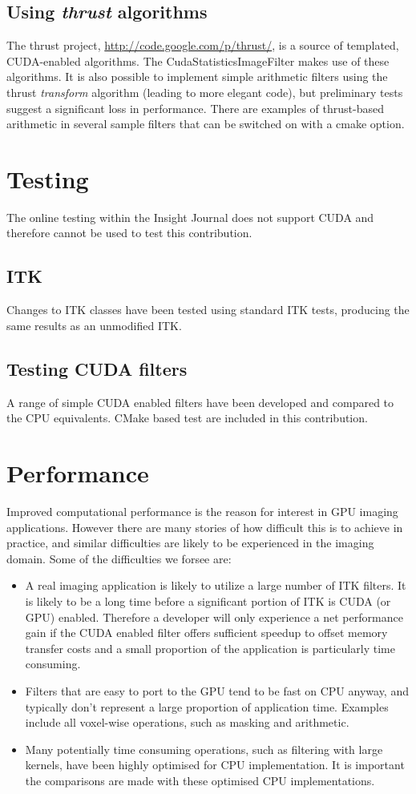 \documentclass{InsightArticle}
\begin{document}
\subsection{Using {\em thrust} algorithms}
The thrust project, \url{http://code.google.com/p/thrust/}, is a
source of templated, CUDA-enabled algorithms. The
CudaStatisticsImageFilter makes use of these algorithms. It is also
possible to implement simple arithmetic filters using the thrust {\em
  transform} algorithm (leading to more elegant code), but preliminary
tests suggest a significant loss in performance. There are
examples of thrust-based arithmetic in several sample filters that can
be switched on with a cmake option.

\section{Testing}
The online testing within the Insight Journal does not support CUDA
and therefore cannot be used to test this contribution.
\subsection{ITK}
Changes to ITK classes have been tested using standard ITK tests,
producing the same results as an unmodified ITK.
\subsection{Testing CUDA filters}
A range of simple CUDA enabled filters have been developed and
compared to the CPU equivalents. CMake based test are included in this
contribution.

\section{Performance}
Improved computational performance is the reason for interest in GPU
imaging applications. However there are many stories of how difficult
this is to achieve in practice, and similar difficulties are likely to
be experienced in the imaging domain. Some of the difficulties we
forsee are:
\begin{itemize}
\item A real imaging application is likely to utilize a large number
  of ITK filters. It is likely to be a long time before a significant
  portion of ITK is CUDA (or GPU) enabled. Therefore a developer will
  only experience a net performance gain if the CUDA enabled filter
  offers sufficient speedup to offset memory transfer costs and a
  small proportion of the application is particularly time consuming.
\item Filters that are easy to port to the GPU tend to be fast on CPU
  anyway, and typically don't represent a large proportion of
  application time. Examples include all voxel-wise operations, such
  as masking and arithmetic.
\item Many potentially time consuming operations, such as filtering
  with large kernels, have been highly optimised for CPU
  implementation. It is important the comparisons are made with these
  optimised CPU implementations.
\end{itemize}
\end{document}
